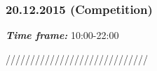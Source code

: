 \subsubsection{20.12.2015 (Competition)}
\textit{\textbf{Time frame:}} 10:00-22:00 

/////////////////////////////